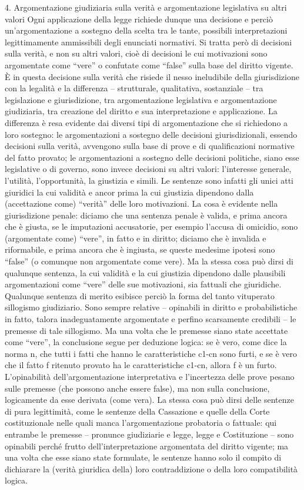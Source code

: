 4. Argomentazione giudiziaria sulla verità e argomentazione legislativa su altri valori
Ogni applicazione della legge richiede dunque una decisione e perciò un’argomentazione a sostegno della scelta tra le tante, possibili interpretazioni legittimamente ammissibili degli enunciati normativi. Si tratta però di decisioni sulla verità, e non su altri valori, cioè di decisioni le cui motivazioni sono argomentate come “vere” o confutate come “false” sulla base del diritto vigente. È in questa decisione sulla verità che risiede il nesso ineludibile della giurisdizione con la legalità e la differenza – strutturale, qualitativa, sostanziale – tra legislazione e giurisdizione, tra argomentazione legislativa e argomentazione giudiziaria, tra creazione del diritto e sua interpretazione e applicazione. La differenza è resa evidente dai diversi tipi di argomentazione che si richiedono a loro sostegno: le argomentazioni a sostegno delle decisioni giurisdizionali, essendo decisioni sulla verità, avvengono sulla base di prove e di qualificazioni normative del fatto provato; le argomentazioni a sostegno delle decisioni politiche, siano esse legislative o di governo, sono invece decisioni su altri valori: l’interesse generale, l’utilità, l’opportunità, la giustizia e simili. Le sentenze sono infatti gli unici atti giuridici la cui validità e ancor prima la cui giustizia dipendono dalla (accettazione come) “verità” delle loro motivazioni. La cosa è evidente nella giurisdizione penale: diciamo che una sentenza penale è valida, e prima ancora che è giusta, se le imputazioni accusatorie, per esempio l’accusa di omicidio, sono (argomentate come) “vere”, in fatto e in diritto; diciamo che è invalida e riformabile, e prima ancora che è ingiusta, se queste medesime ipotesi sono “false” (o comunque non argomentate come vere). Ma la stessa cosa può dirsi di qualunque sentenza, la cui validità e la cui giustizia dipendono dalle plausibili argomentazioni come “vere” delle sue motivazioni, sia fattuali che giuridiche. Qualunque sentenza di merito esibisce perciò la forma del tanto vituperato sillogismo giudiziario. Sono sempre relative – opinabili in diritto e probabilistiche in fatto, talora inadeguatamente argomentate e perfino scarsamente credibili – le premesse di tale sillogismo. Ma una volta che le premesse siano state accettate come “vere”, la conclusione segue per deduzione logica: se è vero, come dice la norma n, che tutti i fatti che hanno le caratteristiche c1-cn sono furti, e se è vero che il fatto f ritenuto provato ha le caratteristiche c1-cn, allora f è un furto. L’opinabilità dell’argomentazione interpretativa e l’incertezza delle prove pesano sulle premesse (che possono anche essere false), ma non sulla conclusione, logicamente da esse derivata (come vera). La stessa cosa può dirsi delle sentenze di pura legittimità, come le sentenze della Cassazione e quelle della Corte costituzionale nelle quali manca l’argomentazione probatoria o fattuale: qui entrambe le premesse – pronunce giudiziarie e legge, legge e Costituzione – sono opinabili perché frutto dell’interpretazione argomentata del diritto vigente; ma una volta che esse siano state formulate, le sentenze hanno solo il compito di dichiarare la (verità giuridica della) loro contraddizione o della loro compatibilità logica.


